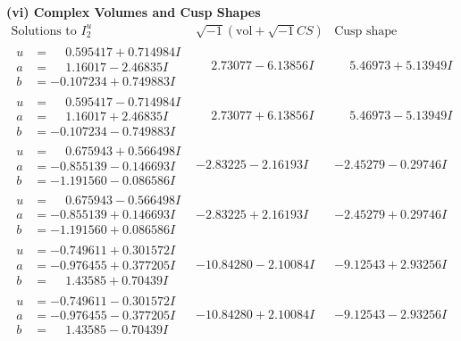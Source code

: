 \documentclass[1p]{elsarticle_modified}
\theoremstyle{definition}
\newcommand{\I}{\sqrt{-1}}
\begin{document}
\newpage\flushleft \textbf{(vi) Complex Volumes and Cusp Shapes}
$$\begin{array}{c|c|c}  
\text{Solutions to }I^u_{2}& \I (\text{vol} + \sqrt{-1}CS) & \text{Cusp shape}\\
 \hline 
\begin{aligned}
u &= \phantom{-}0.595417 + 0.714984 I \\
a &= \phantom{-}1.16017 - 2.46835 I \\
b &= -0.107234 + 0.749883 I\end{aligned}
 & \phantom{-}2.73077 - 6.13856 I & \phantom{-}5.46973 + 5.13949 I \\ \hline\begin{aligned}
u &= \phantom{-}0.595417 - 0.714984 I \\
a &= \phantom{-}1.16017 + 2.46835 I \\
b &= -0.107234 - 0.749883 I\end{aligned}
 & \phantom{-}2.73077 + 6.13856 I & \phantom{-}5.46973 - 5.13949 I \\ \hline\begin{aligned}
u &= \phantom{-}0.675943 + 0.566498 I \\
a &= -0.855139 - 0.146693 I \\
b &= -1.191560 - 0.086586 I\end{aligned}
 & -2.83225 - 2.16193 I & -2.45279 - 0.29746 I \\ \hline\begin{aligned}
u &= \phantom{-}0.675943 - 0.566498 I \\
a &= -0.855139 + 0.146693 I \\
b &= -1.191560 + 0.086586 I\end{aligned}
 & -2.83225 + 2.16193 I & -2.45279 + 0.29746 I \\ \hline\begin{aligned}
u &= -0.749611 + 0.301572 I \\
a &= -0.976455 + 0.377205 I \\
b &= \phantom{-}1.43585 + 0.70439 I\end{aligned}
 & -10.84280 - 2.10084 I & -9.12543 + 2.93256 I \\ \hline\begin{aligned}
u &= -0.749611 - 0.301572 I \\
a &= -0.976455 - 0.377205 I \\
b &= \phantom{-}1.43585 - 0.70439 I\end{aligned}
 & -10.84280 + 2.10084 I & -9.12543 - 2.93256 I \\ \hline\begin{aligned}

\end{aligned}
\end{array}$$
\end{document}
